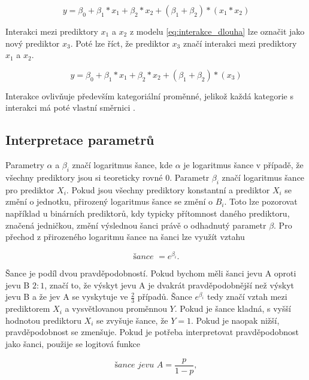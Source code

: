 \begin{equation}
    \label{eq:interakce_dlouha}
    y = \beta_0 + \beta_1*x_1 + \beta_2*x_2 + (\beta_1 + \beta_2)*(x_1*x_2)
\end{equation}

Interakci mezi prediktory $x_1$ a $x_2$ z modelu \ref{eq:interakce_dlouha} lze označit jako nový prediktor $x_3$. Poté lze říct, že prediktor $x_3$ značí interakci mezi prediktory
$x_1$ a $x_2$.

\begin{equation}
    \label{eq:interakce}
    y = \beta_0 + \beta_1*x_1 + \beta_2*x_2 + (\beta_1 + \beta_2)*(x_3)
\end{equation}

Interakce ovlivňuje především kategoriální proměnné, jelikož každá kategorie s interakci má poté vlastní směrnici \cite{hindls_statistika_2018}.

\subsection{Interpretace parametrů}
Parametry $\alpha$ a $\beta_i$ značí logaritmus šance, kde $\alpha$ je logaritmus šance v případě, že všechny prediktory
jsou si teoreticky rovné $0$. Parametr $\beta_i$ značí logaritmus šance pro prediktor $X_i$.
Pokud jsou všechny prediktory konstantní a prediktor $X_i$ se změní o jednotku, přirozený logaritmus
šance se změní o $B_i$. Toto lze pozorovat například u binárních prediktorů, kdy typicky přítomnost
daného prediktoru, značená jedničkou, změní výslednou šanci právě o odhadnutý parametr $\beta$.
Pro přechod z přirozeného logaritmu šance na šanci lze využít vztahu

\begin{equation}
\textit{šance } = e^{\beta_i}.
\end{equation}

Šance je podíl dvou pravděpodobností. Pokud bychom měli šanci jevu A oproti jevu B $2 : 1$, značí to, že výskyt jevu A je dvakrát pravděpodobnější než
výskyt jevu B a že jev A se vyskytuje ve $\frac{2}{3}$ případů. Šance $e^{\beta_i}$ tedy značí vztah mezi prediktorem $X_i$ a vysvětlovanou proměnnou $Y$. Pokud je
šance kladná, s vyšší hodnotou prediktoru $X_i$ se zvyšuje šance, že $Y = 1$. Pokud je naopak nižší, pravděpodobnost se zmenšuje. Pokud je potřeba
interpretovat pravděpodobnost jako šanci, použije se logitová funkce

\begin{equation}
    \label{eq:logitova_funkce}
    \textit{šance jevu A} = \frac{p}{1 - p},
\end{equation}

